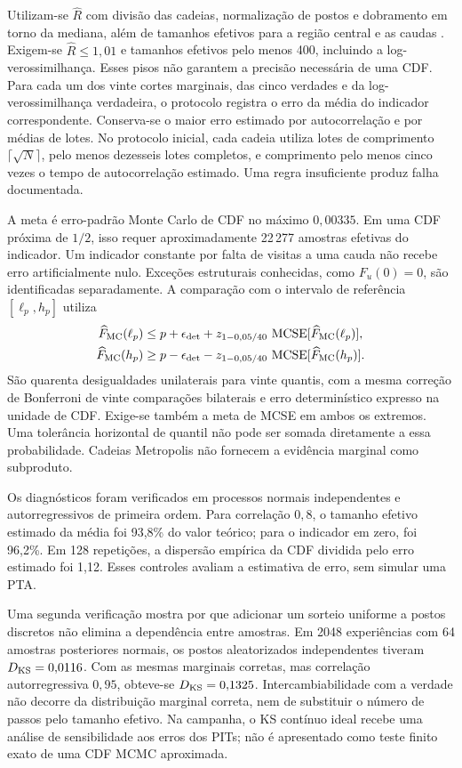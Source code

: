 Utilizam-se \(\widehat R\) com divisão das cadeias, normalização de
postos e dobramento em torno da mediana, além de tamanhos efetivos
para a região central e as caudas \cite{vehtari2021}. Exigem-se
\(\widehat R\leq1{,}01\) e tamanhos efetivos pelo menos 400,
incluindo a log-verossimilhança. Esses pisos não garantem a precisão
necessária de uma CDF. Para cada um dos vinte cortes marginais,
das cinco verdades e da log-verossimilhança verdadeira, o protocolo
registra o erro da média do indicador correspondente. Conserva-se o
maior erro estimado por autocorrelação e por médias de lotes.
No protocolo inicial, cada cadeia utiliza lotes de comprimento
\(\lceil\sqrt{N}\rceil\), pelo menos dezesseis lotes completos,
e comprimento pelo menos cinco vezes o tempo de autocorrelação
estimado. Uma regra insuficiente produz falha documentada.

A meta é erro-padrão Monte Carlo de CDF no máximo \(0{,}00335\).
Em uma CDF próxima de \(1/2\), isso requer aproximadamente
22\,277 amostras efetivas do indicador. Um indicador constante por
falta de visitas a uma cauda não recebe erro artificialmente nulo.
Exceções estruturais conhecidas, como \(F_u(0)=0\), são identificadas
separadamente. A comparação com o intervalo de referência
\([\ell_p,h_p]\) utiliza
\begin{align}
 \widehat F_{\rm MC}(\ell_p)&\leq p+\epsilon_{\rm det}
       +z_{1-0{,}05/40}\,\operatorname{MCSE}[\widehat F_{\rm MC}(\ell_p)],\nonumber\\
 \widehat F_{\rm MC}(h_p)&\geq p-\epsilon_{\rm det}
       -z_{1-0{,}05/40}\,\operatorname{MCSE}[\widehat F_{\rm MC}(h_p)].
 \label{eq:inf-referencia-mcmc}
\end{align}
São quarenta desigualdades unilaterais para vinte quantis, com a mesma
correção de Bonferroni de vinte comparações bilaterais e erro
determinístico expresso na unidade de CDF. Exige-se também a meta de
MCSE em ambos os extremos. Uma tolerância horizontal de quantil não
pode ser somada diretamente a essa probabilidade. Cadeias Metropolis
não fornecem a evidência marginal como subproduto.

Os diagnósticos foram verificados em processos normais independentes
e autorregressivos de primeira ordem. Para correlação \(0{,}8\), o
tamanho efetivo estimado da média foi 93,8\% do valor teórico; para
o indicador em zero, foi 96,2\%. Em 128 repetições, a dispersão
empírica da CDF dividida pelo erro estimado foi 1,12. Esses controles
avaliam a estimativa de erro, sem simular uma PTA.

Uma segunda verificação mostra por que adicionar um sorteio uniforme
a postos discretos não elimina a dependência entre amostras.
Em 2048 experiências com 64 amostras posteriores normais, os postos
aleatorizados independentes tiveram \(D_{\rm KS}=0{,}0116\).
Com as mesmas marginais corretas, mas correlação autorregressiva
\(0{,}95\), obteve-se \(D_{\rm KS}=0{,}1325\).
Intercambiabilidade com a verdade não decorre da distribuição marginal
correta, nem de substituir o número de passos pelo tamanho efetivo.
Na campanha, o KS contínuo ideal recebe uma análise de sensibilidade
aos erros dos PITs; não é apresentado como teste finito exato de
uma CDF MCMC aproximada.

